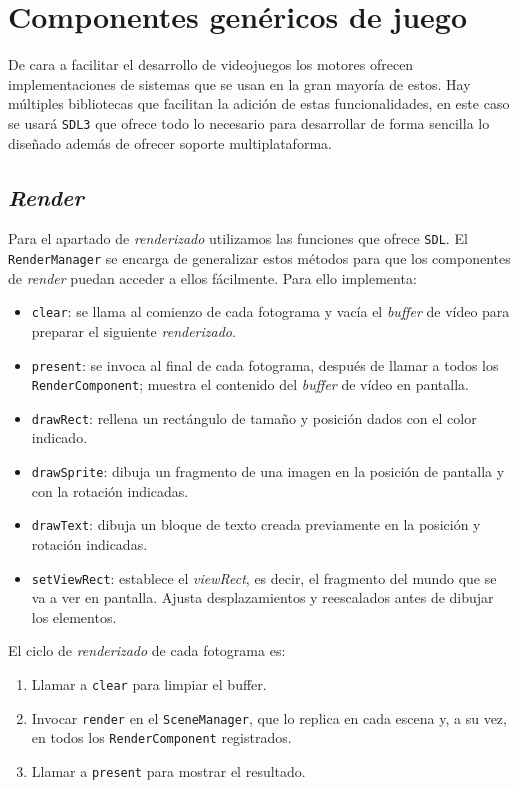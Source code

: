\section{Componentes genéricos de juego}
De cara a facilitar el desarrollo de videojuegos los motores ofrecen implementaciones de sistemas que se usan en la gran mayoría de estos. Hay múltiples bibliotecas que facilitan la adición de estas funcionalidades, en este caso se usará \texttt{SDL3} que ofrece todo lo necesario para desarrollar de forma sencilla lo diseñado además de ofrecer soporte multiplataforma.

\subsection{\textit{Render}}
Para el apartado de \textit{renderizado} utilizamos las funciones que ofrece \texttt{SDL}. El \texttt{RenderManager} se encarga de generalizar estos métodos para que los componentes de \textit{render} puedan acceder a ellos fácilmente. Para ello implementa: 

\begin{itemize}
	\item \texttt{clear}: se llama al comienzo de cada fotograma y vacía el \textit{buffer} de vídeo para preparar el siguiente \textit{renderizado}.
	\item \texttt{present}: se invoca al final de cada fotograma, después de llamar a todos los \texttt{RenderComponent}; muestra el contenido del \textit{buffer} de vídeo en pantalla.
	\item \texttt{drawRect}: rellena un rectángulo de tamaño y posición dados con el color indicado.
	\item \texttt{drawSprite}: dibuja un fragmento de una imagen en la posición de pantalla y con la rotación indicadas.
	\item \texttt{drawText}: dibuja un bloque de texto creada previamente en la posición y rotación indicadas. 
	\item \texttt{setViewRect}: establece el \textit{viewRect}, es decir, el fragmento del mundo que se va a ver en pantalla. Ajusta desplazamientos y reescalados antes de dibujar los elementos.
\end{itemize}

El ciclo de \textit{renderizado} de cada fotograma es: 
\begin{enumerate}
	\item Llamar a \texttt{clear} para limpiar el buffer.
	\item Invocar \texttt{render} en el \texttt{SceneManager}, que lo replica en cada escena y, a su vez, en todos los \texttt{RenderComponent} registrados. 
	\item Llamar a \texttt{present} para mostrar el resultado.
\end{enumerate}

